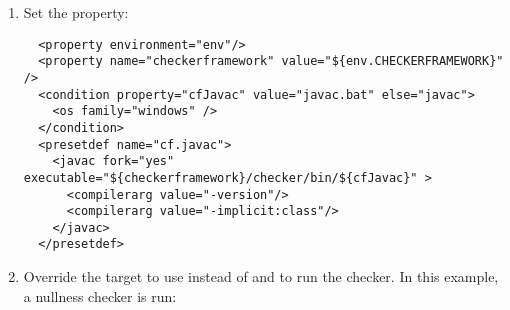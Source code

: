 \begin{enumerate}
\item
Set the  property:

\begin{smaller}
\begin{Verbatim}
  <property environment="env"/>
  <property name="checkerframework" value="${env.CHECKERFRAMEWORK}" />
  <condition property="cfJavac" value="javac.bat" else="javac">
    <os family="windows" />
  </condition>
  <presetdef name="cf.javac">
    <javac fork="yes" executable="${checkerframework}/checker/bin/${cfJavac}" >
      <compilerarg value="-version"/>
      <compilerarg value="-implicit:class"/>
    </javac>
  </presetdef>
\end{Verbatim}
\end{smaller}

\item
Override the  target to
use  instead of  and to run the checker.
In this example, a nullness checker is run:


\end{enumerate}

